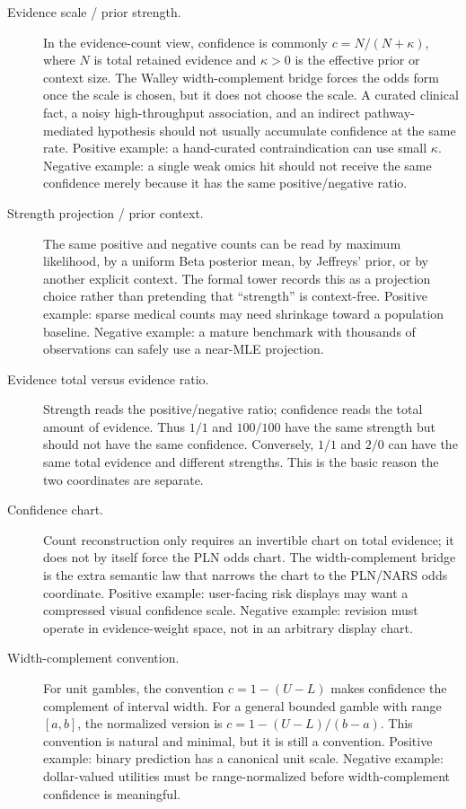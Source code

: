 \documentclass[]{article}
\begin{document}
\begin{description}
\item[Evidence scale / prior strength.]
      In the evidence-count view, confidence is commonly
      $c = N/(N+\kappa)$, where $N$ is total retained evidence and
      $\kappa > 0$ is the effective prior or context size. The Walley
      width-complement bridge forces the odds form once the scale is chosen,
      but it does not choose the scale. A curated clinical fact, a noisy
      high-throughput association, and an indirect pathway-mediated
      hypothesis should not usually accumulate confidence at the same rate.
      Positive example: a hand-curated contraindication can use small
      $\kappa$. Negative example: a single weak omics hit should not receive
      the same confidence merely because it has the same positive/negative
      ratio.

\item[Strength projection / prior context.]
      The same positive and negative counts can be read by maximum
      likelihood, by a uniform Beta posterior mean, by Jeffreys' prior, or by
      another explicit context. The formal tower records this as a projection
      choice rather than pretending that ``strength'' is context-free.
      Positive example: sparse medical counts may need shrinkage toward a
      population baseline. Negative example: a mature benchmark with thousands
      of observations can safely use a near-MLE projection.

\item[Evidence total versus evidence ratio.]
      Strength reads the positive/negative ratio; confidence reads the total
      amount of evidence. Thus $1/1$ and $100/100$ have the same strength but
      should not have the same confidence. Conversely, $1/1$ and $2/0$ can
      have the same total evidence and different strengths. This is the basic
      reason the two coordinates are separate.

\item[Confidence chart.]
      Count reconstruction only requires an invertible chart on total
      evidence; it does not by itself force the PLN odds chart. The
      width-complement bridge is the extra semantic law that narrows the
      chart to the PLN/NARS odds coordinate. Positive example: user-facing
      risk displays may want a compressed visual confidence scale. Negative
      example: revision must operate in evidence-weight space, not in an
      arbitrary display chart.

\item[Width-complement convention.]
      For unit gambles, the convention $c = 1 - (U-L)$ makes confidence the
      complement of interval width. For a general bounded gamble with range
      $[a,b]$, the normalized version is
      $c = 1 - (U-L)/(b-a)$. This convention is natural and minimal, but it is
      still a convention. Positive example: binary prediction has a canonical
      unit scale. Negative example: dollar-valued utilities must be
      range-normalized before width-complement confidence is meaningful.


\end{description}
\end{document}
